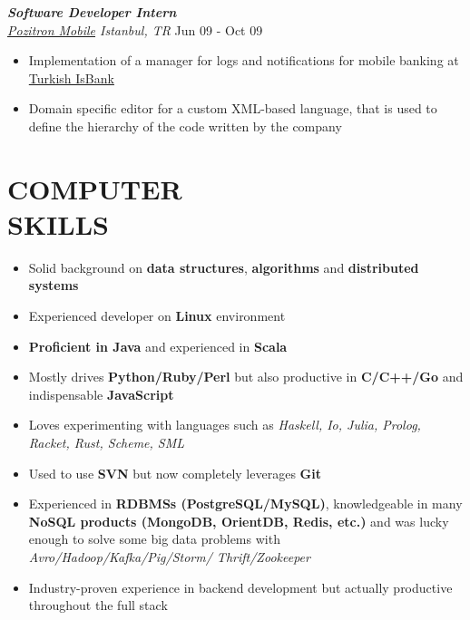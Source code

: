 \documentclass[line, margin]{res}
\begin{document}
\begin{resume}
	{\sl \textbf{Software Developer Intern} \\ \href{http://www.pozitron.com/}{Pozitron Mobile} Istanbul, TR} \hfill Jun 09 - Oct 09\\
	\vspace{-0.3cm}
	\begin{itemize} \itemsep -2pt
		\item Implementation of a manager for logs and notifications for mobile banking at \href{http://www.isbank.com.tr/English/}{Turkish IsBank}
		\item Domain specific editor for a custom XML-based language, that is used to define the hierarchy of the code written by the company
	\end{itemize}

\section{COMPUTER \\ SKILLS} 
	\begin{itemize}
		\item Solid background on \textbf{data structures}, \textbf{algorithms} and \textbf{distributed systems}
		\item Experienced developer on \textbf{Linux} environment 
		\item \textbf{Proficient in Java} and experienced in \textbf{Scala}
		\item Mostly drives \textbf{Python/Ruby/Perl} but also productive in \textbf{C/C++/Go} and indispensable \textbf{JavaScript}
		\item Loves experimenting with languages such as \textit{Haskell, Io, Julia, Prolog, Racket, Rust, Scheme, SML}
		\item Used to use \textbf{SVN} but now completely leverages \textbf{Git}
		\item Experienced in \textbf{RDBMSs (PostgreSQL/MySQL)}, knowledgeable in many \textbf{NoSQL products (MongoDB, OrientDB, Redis, etc.)} and was lucky enough to solve some big data problems with \textit{Avro/Hadoop/Kafka/Pig/Storm/ Thrift/Zookeeper}
		\item Industry-proven experience in backend development but actually productive throughout the full stack
	\end{itemize}
\end{resume}
\end{document}
